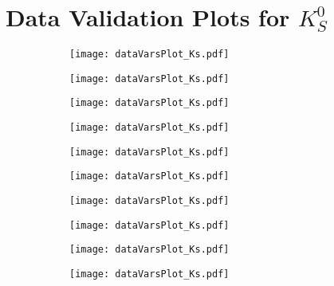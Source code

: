 \chapter{Data Validation Plots for $K_S^0$}

\begin{figure}[H]
\caption{The distribution of the training variables in KsFinder. The blue and purple solid lines in the top plots are the total and true $K_S^0$ distributions from generic MC, respectively. The bottom plots are the data-MC ratio before (blue) and after (red) applying \textit{KsFinder} cut.}
\begin{subfigure}{0.5\linewidth}
\texttt{[image: dataVarsPlot\_Ks.pdf]}
\end{subfigure}
\begin{subfigure}{0.5\linewidth}
\texttt{[image: dataVarsPlot\_Ks.pdf]}
\end{subfigure}
\end{figure}

\begin{figure}[H]
\ContinuedFloat
\begin{subfigure}{0.5\linewidth}
	\texttt{[image: dataVarsPlot\_Ks.pdf]}
\end{subfigure}
\begin{subfigure}{0.5\linewidth}
	\texttt{[image: dataVarsPlot\_Ks.pdf]}
\end{subfigure}
\begin{subfigure}{0.5\linewidth}
	\texttt{[image: dataVarsPlot\_Ks.pdf]}
\end{subfigure}
\begin{subfigure}{0.5\linewidth}
	\texttt{[image: dataVarsPlot\_Ks.pdf]}
\end{subfigure}
\end{figure}

\begin{figure}[H]
\ContinuedFloat
\begin{subfigure}{0.5\linewidth}
	\texttt{[image: dataVarsPlot\_Ks.pdf]}
\end{subfigure}
\begin{subfigure}{0.5\linewidth}
	\texttt{[image: dataVarsPlot\_Ks.pdf]}
\end{subfigure}
\begin{subfigure}{0.5\linewidth}
	\texttt{[image: dataVarsPlot\_Ks.pdf]}
\end{subfigure}
\begin{subfigure}{0.5\linewidth}
\texttt{[image: dataVarsPlot\_Ks.pdf]}
\end{subfigure}
\end{figure}


